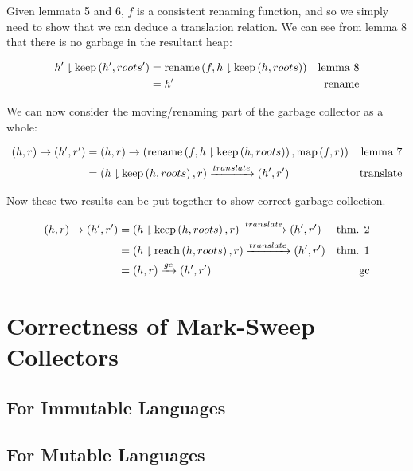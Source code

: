 \begin{theorem}
  Given lemmata 5 and 6, $f$ is a consistent renaming function, and so
  we simply need to show that we can deduce a translation relation. We
  can see from lemma 8 that there is no garbage in the resultant heap:

  \begin{align*}
    h' \downharpoonright \mathrm{keep}\left(h', roots'\right) &= \mathrm{rename}\left(f, h \downharpoonright
      \mathrm{keep}\left(h, roots\right)\right) &\mbox {lemma 8}\\
    &= h' & \mbox{rename}
  \end{align*}

  We can now consider the moving/renaming part of the garbage
  collector as a whole:

  \begin{align*}
    (h, r) \to (h', r') &= (h, r) \to \left(\mathrm{rename}\left(f, h \downharpoonright
        \mathrm{keep}\left(h, roots\right)\right), \mathrm{map}\left(f, r\right)\right) & \mbox{lemma 7}\\
    &= (h \downharpoonright \mathrm{keep}\left(h, roots\right), r) \xrightarrow{translate} (h', r') &\mbox{translate}
  \end{align*}
\end{theorem}

Now these two results can be put together to show correct garbage
collection.

\begin{theorem}
  \begin{align*}
    (h, r) \to (h', r') &= (h \downharpoonright \mathrm{keep}\left(h, roots\right), r) \xrightarrow{translate}
    (h', r') & \mbox{thm. 2}\\
    &= (h \downharpoonright \mathrm{reach}\left(h, roots\right), r) \xrightarrow{translate} (h', r') &
    \mbox{thm. 1}\\
    &= (h, r) \xrightarrow{gc} (h', r') &\mbox{gc}
  \end{align*}
\end{theorem}

\section{Correctness of Mark-Sweep Collectors}


\subsection{For Immutable Languages}


\subsection{For Mutable Languages}

